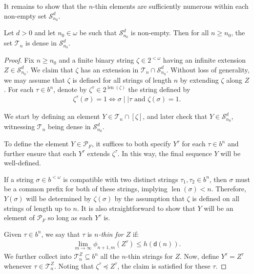 It remains to show that the $n$-thin elements are sufficiently numerous within each non-empty set $\mathcal{S}^d_{n_0}.$
\begin{lemma}
    \label{lemma:n_thins_dense_in_complement}
    Let $d > 0$ and let $n_0 \in \omega$ be such that $\mathcal{S}^d_{n_0}$ is non-empty. Then for all $n \geq n_0$, the set $\mathcal{T}_n$ is dense in $\mathcal{S}^d_{n_0}$.
\end{lemma}
\begin{proof}
    Fix $n \geq n_0$ and a finite binary string $\zeta \in 2^{< \omega}$ having an infinite extension $Z \in \mathcal{S}^d_{n_0}$. We claim that $\zeta$ has an extension in $\mathcal{T}_n \cap \mathcal{S}^d_{n_0}$. Without loss of generality, we may assume that $\zeta$ is defined for all strings of length $n$ by extending $\zeta$ along $Z$. For each $\tau \in b^n$, denote by $\zeta^\tau \in 2^{\operatorname{len}(\zeta)}$ the string defined by
    \begin{align*}
        \zeta^\tau(\sigma) = 1 \iff \sigma \mid \mid \tau \text{ and } \zeta(\sigma) = 1.
    \end{align*}

    We start by defining an element $Y \in \mathcal{T}_n \cap [\zeta]$, and later check that $Y \in \mathcal{S}^d_{n_0}$, witnessing $\mathcal{T}_n$ being dense in $\mathcal{S}^d_{n_0}$.
    
    To define the element $Y \in \mathcal{P}_F$, it suffices to both specify $Y^\tau$ for each $\tau \in b^n$ and further ensure that each $Y^\tau$ extends $\zeta^\tau$. In this way, the final sequence $Y$ will be well-defined.
    
    If a string $\sigma \in b^{<\omega}$ is compatible with two distinct strings $\tau_1, \tau_2 \in b^n$, then $\sigma$ must be a common prefix for both of these strings, implying $\operatorname{len}(\sigma) < n$. Therefore, $Y(\sigma)$ will be determined by $\zeta(\sigma)$ by the assumption that $\zeta$ is defined on all strings of length up to $n$. It is also straightforward to show that $Y$ will be an element of $\mathcal{P}_F$ so long as each $Y^\tau$ is.
    
    Given $\tau \in b^n$, we say that $\tau$ is \textit{$n$-thin for $Z$} if:    
    \begin{align*}
        \lim_{m \to \infty} \phi_{n + 1, m}(Z^\tau) \leq h(\mathsf{d}(n)).
    \end{align*}
    We further collect into $\mathcal{T}^Z_n \subseteq b^n$ all the $n$-thin strings for $Z$. Now, define $Y^\tau = Z^\tau$ whenever $\tau \in \mathcal{T}^Z_n$. Noting that $\zeta^\tau \preceq Z^\tau$, the claim is satisfied for these $\tau$. 
    

\end{proof}
